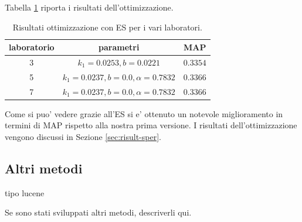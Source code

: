 Tabella \ref{tab:es} riporta i risultati dell'ottimizzazione.
\begin{table}[htdp]
\caption{Risultati ottimizzazione con ES per i vari laboratori.}
\begin{center}
\begin{tabular}{|c|c|c|}
\hline
laboratorio & parametri & MAP \\
 \hline
3 & $k_1 = 0.0253, b = 0.0221$ & $0.3354$ \\
5 & $k_1 = 0.0237, b = 0.0, \alpha=0.7832$ & $0.3366$ \\
7 & $k_1 = 0.0237, b = 0.0, \alpha=0.7832$ & $0.3366$ \\
\hline
\end{tabular}
\end{center}
\label{tab:es}
\end{table}

Come si puo' vedere grazie all'ES si e' ottenuto un notevole miglioramento in termini di MAP rispetto alla nostra prima versione. I risultati dell'ottimizzazione vengono discussi in Sezione \ref{sec:risult-sper}.

\subsection{Altri metodi}
tipo lucene
\label{sec:altri-metodi}

Se sono stati sviluppati altri metodi, descriverli qui.

